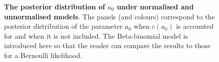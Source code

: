 \documentclass[a4paper, notitlepage, 11pt]{article}
\begin{document}
\begin{figure}
\hfill
\caption{\textbf{The posterior distribution of $a_0$ under normalised and unnormalised models}.
The panels (and colours) correspond to the posterior distribution of the parameter $a_0$ when $c(a_0)$ is accounted for and when it is not included.
The Beta-binomial model is introduced here so that the reader can compare the results to those for a Bernoulli likelihood.
}
\label{fig:normalisation}
\end{figure}
\end{document}
